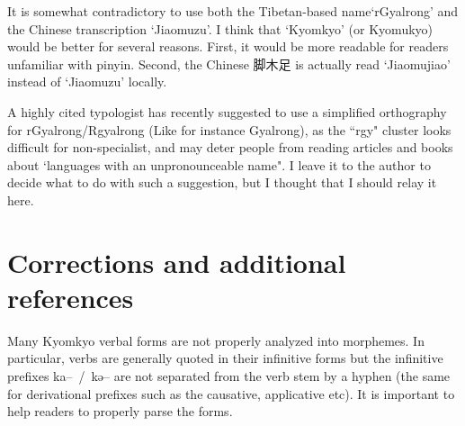 \documentclass[oldfontcommands,oneside,a4paper,11pt]{article}
\newcommand{\ipa}[1]{{\phon \mbox{#1}}} %
\newcommand{\zh}[1]{{\cn #1}}
\begin{document}
It is somewhat contradictory to use both the Tibetan-based name`rGyalrong' and the Chinese transcription `Jiaomuzu'. I think that `Kyomkyo' (or Kyomukyo) would be better for several reasons. First, it would be more readable for readers unfamiliar with pinyin. Second, the Chinese \zh{脚木足} is actually read `Jiaomujiao' instead of `Jiaomuzu' locally. 

A highly cited typologist has recently suggested to use a simplified orthography for rGyalrong/Rgyalrong (Like for instance Gyalrong), as the ``rgy" cluster looks difficult for non-specialist, and may deter people from reading articles and books about `languages with an unpronounceable name". I leave it to the author to decide what to do with such a suggestion, but I thought that I should relay it here.


 \section{Corrections and additional references}
Many Kyomkyo verbal forms are not properly analyzed into morphemes. In particular, verbs are generally quoted in their infinitive forms but the infinitive prefixes \ipa{ka-- / kə--} are not separated from the verb stem by a hyphen (the same for derivational prefixes such as the causative, applicative etc). It is important to help readers to properly parse the forms.
\end{document}
